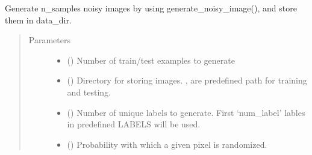 \documentclass[letterpaper,10pt,english]{sphinxmanual}
\begin{document}
\begin{fulllineitems}
\label{\detokenize{data_sets:data_sets.generate_data_set}}
\pysigstartsignatures
{}
\pysigstopsignatures
\sphinxAtStartPar
Generate n\_samples noisy images by using generate\_noisy\_image(), and store them in data\_dir.
\begin{quote}\begin{description}
\item[{Parameters}] \leavevmode\begin{itemize}
\item {} 
\sphinxAtStartPar
{} () \textendash{} Number of train/test examples to generate

\item {} 
\sphinxAtStartPar
{} () \textendash{} Directory for storing images. ,  are predefined path for training and testing.

\item {} 
\sphinxAtStartPar
{} (\sphinxstyleliteralemphasis{\sphinxupquote{ {[}}}\sphinxstyleliteralemphasis{\sphinxupquote{,}}\sphinxstyleliteralemphasis{\sphinxupquote{{]}}}\sphinxstyleliteralemphasis{\sphinxupquote{, }}) \textendash{} Number of unique labels to generate. First ‘num\_label’ lables in predefined LABELS will be used.

\item {} 
\sphinxAtStartPar
{} (\sphinxstyleliteralemphasis{\sphinxupquote{ {[}}}\sphinxstyleliteralemphasis{\sphinxupquote{,}}\sphinxstyleliteralemphasis{\sphinxupquote{{]}}}\sphinxstyleliteralemphasis{\sphinxupquote{, }}) \textendash{} Probability with which a given pixel is randomized.


\end{itemize}
\end{description}
\end{quote}
\end{fulllineitems}
\end{document}
